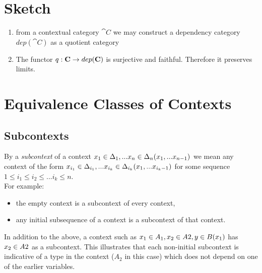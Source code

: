 \documentclass[10pt,a4paper]{scrartcl}
\begin{document}
\newpage

\section{Sketch}
\begin{enumerate}
\item{
from a contextual category $\cat{C}$ we may construct a dependency category $dep(\cat{C})$ as a quotient category
}
\item{
The functor $q:\textbf{C} \rightarrow dep(\textbf{C})$ is surjective and faithful.
Therefore it preserves limits.
}
\end{enumerate}




\section{Equivalence Classes of Contexts}
\subsection{Subcontexts}
By a \textit{subcontext} of a context $x_1 \in \Delta_1,... x_{n} \in \Delta_{n}(x_1,...x_{n-1})$ we mean any context
of the form
$x_{i_1} \in {\Delta}_{i_1},... x_{i_k} \in {\Delta}_{i_k}(x_1,...x_{i_k-1})$ for some sequence 
$1 \leq i_1 \leq i_2 \leq ... i_k \leq n$. \\

\noindent
For example:
\begin {itemize}


\item the empty context  is a subcontext of every 
context,
\item any initial subsequence of a context is a subcontext of that context.
\end{itemize}

\noindent
In addition to the above, a context such as $x_1 \in A_1,x_2 \in A2,y \in B(x_1)$ has 
$x_2 \in A2$ as a subcontext. This illustrates that each non-initial subcontext is indicative of a type in the context ($A_2$ in this case)
which does not depend on one of the earlier variables.
 




\end{document}

